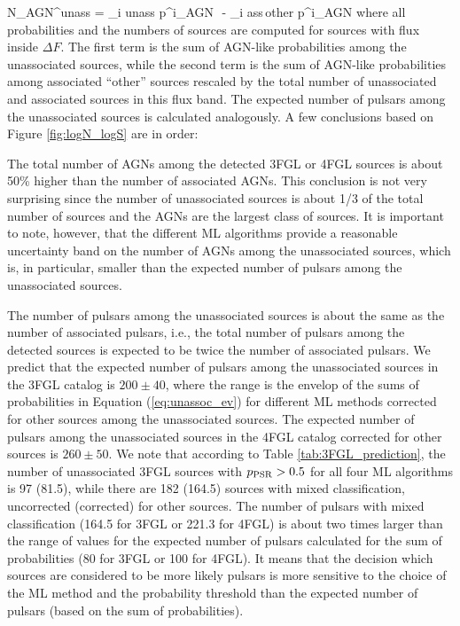 \be
{}
N_{\rm AGN}^{\rm unass} = \sum_{i \in \rm unass} p^i_{\rm AGN}\,\, - \sum_{i \in \rm ass\,other} p^i_{\rm AGN} \cdot 
{}
\ee
where all probabilities and the numbers of sources are computed for sources with flux inside $\Delta F$.
The first term is the sum of AGN-like probabilities among the unassociated sources,
while the second term is the sum of AGN-like probabilities among associated ``other'' sources rescaled by the total number
of unassociated and associated sources in this flux band.
The expected number of pulsars among the unassociated sources is calculated analogously.
A few conclusions based on Figure \ref{fig:logN_logS} are in order:
\ben
\item
The total number of AGNs among the detected 3FGL or 4FGL sources is about 50\% higher than the number of associated AGNs.
This conclusion is not very surprising since the number of unassociated sources is about 1/3 of the total number of sources and the 
AGNs are the largest class of sources. It is important to note, however, that the different ML algorithms provide a reasonable uncertainty band on the number of AGNs among the unassociated sources, which is, in particular, smaller than the expected number of pulsars among the unassociated sources.
\item
The number of pulsars among the unassociated sources is about the same as the number of associated pulsars, i.e., the total number of pulsars among the detected sources is expected to be twice the number of associated pulsars.
\een
We predict that the expected number of pulsars among the unassociated sources in the 3FGL catalog
is $200 \pm 40$, where the range is the envelop of the sums of probabilities in Equation (\ref{eq:unassoc_ev})
for different ML methods corrected for other sources among the unassociated sources.
The expected number of pulsars among the unassociated sources in the 4FGL catalog corrected for other sources is $260 \pm 50$.
We note that according to Table \ref{tab:3FGL_prediction}, the number of unassociated 3FGL sources 
with $p_{\rm PSR} > 0.5$ for all four ML algorithms is 97 (81.5), while there are 182 (164.5) sources with mixed classification,
uncorrected (corrected) for other sources.
The number of pulsars with mixed classification (164.5 for 3FGL or 221.3 for 4FGL)
is about two times larger than the range of values for the expected number of pulsars calculated for the sum of probabilities 
(80 for 3FGL or 100 for 4FGL).
It means that the decision which sources are considered to be more likely pulsars is more sensitive to the choice of the ML method
and the probability threshold than the expected number of pulsars (based on the sum of probabilities).

